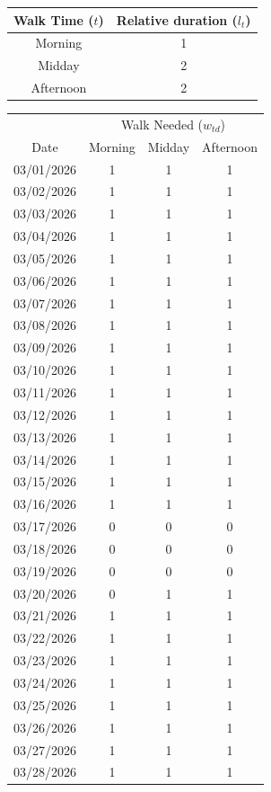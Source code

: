 \documentclass{notes}
\begin{document}
\begin{center}
	\begin{tabular}{c|c}
		Walk Time ($t$) & Relative duration ($l_t$)\\
		\hline
		Morning & 1\\
		Midday & 2\\
		Afternoon & 2
	\end{tabular}

	\vspace{1em}

	\begin{tabular}{c|ccc}
		& \multicolumn{3}{c}{Walk Needed ($w_{td}$)}\\
		Date & Morning & Midday & Afternoon\\
		\hline
		03/01/2026 & 1 & 1 & 1\\
		03/02/2026 & 1 & 1 & 1\\
		03/03/2026 & 1 & 1 & 1\\
		03/04/2026 & 1 & 1 & 1\\
		03/05/2026 & 1 & 1 & 1\\
		03/06/2026 & 1 & 1 & 1\\
		03/07/2026 & 1 & 1 & 1\\
		03/08/2026 & 1 & 1 & 1\\
		03/09/2026 & 1 & 1 & 1\\
		03/10/2026 & 1 & 1 & 1\\
		03/11/2026 & 1 & 1 & 1\\
		03/12/2026 & 1 & 1 & 1\\
		03/13/2026 & 1 & 1 & 1\\
		03/14/2026 & 1 & 1 & 1\\
		03/15/2026 & 1 & 1 & 1\\
		03/16/2026 & 1 & 1 & 1\\
		03/17/2026 & 0 & 0 & 0\\
		03/18/2026 & 0 & 0 & 0\\
		03/19/2026 & 0 & 0 & 0\\
		03/20/2026 & 0 & 1 & 1\\
		03/21/2026 & 1 & 1 & 1\\
		03/22/2026 & 1 & 1 & 1\\
		03/23/2026 & 1 & 1 & 1\\
		03/24/2026 & 1 & 1 & 1\\
		03/25/2026 & 1 & 1 & 1\\
		03/26/2026 & 1 & 1 & 1\\
		03/27/2026 & 1 & 1 & 1\\
		03/28/2026 & 1 & 1 & 1\\

\end{tabular}
\end{center}
\end{document}
